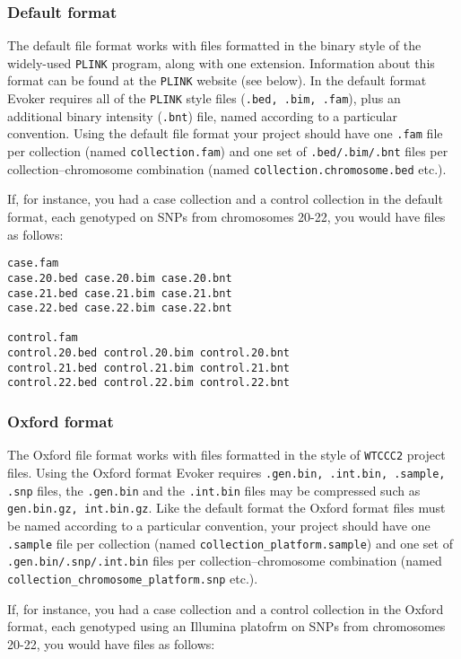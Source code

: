 \documentclass{article}
\begin{document}
\subsubsection{Default format}
The default file format works with files formatted in the binary style of the widely-used \texttt{PLINK} program, along with one extension. Information about this format can be found at the \texttt{PLINK} website (see below). In the default format Evoker requires all of the \texttt{PLINK} style files (\texttt{.bed, .bim, .fam}), plus an additional binary intensity (\texttt{.bnt}) file, named according to a particular convention. Using the default file format your project should have one \texttt{.fam} file per collection (named \texttt{collection.fam}) and one set of \texttt{.bed/.bim/.bnt} files per collection--chromosome combination (named \texttt{collection.chromosome.bed} etc.).

If, for instance, you had a case collection and a control collection in the default format, each genotyped on SNPs from chromosomes 20-22, you would have files as follows:

\begin{verbatim}
case.fam
case.20.bed case.20.bim case.20.bnt 
case.21.bed case.21.bim case.21.bnt 
case.22.bed case.22.bim case.22.bnt 

control.fam
control.20.bed control.20.bim control.20.bnt
control.21.bed control.21.bim control.21.bnt
control.22.bed control.22.bim control.22.bnt
\end{verbatim}

\subsubsection{Oxford format}
The Oxford file format works with files formatted in the style of \texttt{WTCCC2} project files. Using the Oxford format Evoker requires \texttt{.gen.bin, .int.bin, .sample, .snp} files, the \texttt{.gen.bin} and the \texttt{.int.bin} files may be compressed such as \texttt{gen.bin.gz, int.bin.gz}. Like the default format the Oxford format files must be named according to a particular convention, your project should have one \texttt{.sample} file per collection (named \texttt{collection\_platform.sample}) and one set of \texttt{.gen.bin/.snp/.int.bin} files per collection--chromosome combination (named \texttt{collection\_chromosome\_platform.snp} etc.). 

If, for instance, you had a case collection and a control collection in the Oxford format, each genotyped using an Illumina platofrm on SNPs from chromosomes 20-22, you would have files as follows:
\end{document}

